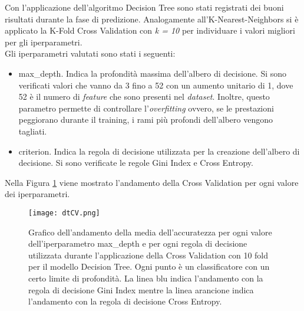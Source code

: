 Con l'applicazione dell'algoritmo Decision Tree sono stati registrati dei buoni risultati durante la fase di predizione. Analogamente all'K-Nearest-Neighbors si è applicato la K-Fold Cross Validation con \emph{k = 10} per individuare i valori migliori per gli iperparametri.\\
Gli iperparametri valutati sono stati i seguenti:
\begin{itemize}
	\item \textsf{max\_depth}. Indica la profondità massima dell'albero di decisione. Si sono verificati valori che vanno da 3 fino a 52 con un aumento unitario di 1, dove 52 è il numero di \emph{feature} che sono presenti nel \emph{dataset}. Inoltre, questo parametro permette di controllare l'\emph{overfitting} ovvero, se le prestazioni peggiorano durante il training, i rami più profondi dell'albero vengono tagliati.
	\item \textsf{criterion}. Indica la regola di decisione utilizzata per la creazione dell'albero di decisione. Si sono verificate le regole Gini Index e Cross Entropy.
\end{itemize}

Nella Figura \ref{fig:dtCV} viene mostrato l'andamento della Cross Validation per ogni valore dei iperparametri.
\begin{figure}[h]
	\begin{center}
		\texttt{[image: dtCV.png]}
		\caption{Grafico dell'andamento della media dell'accuratezza per ogni valore dell'iperparametro max\_depth e per ogni regola di decisione utilizzata durante l'applicazione della Cross Validation con 10 fold per il modello Decision Tree. Ogni punto è un classificatore con un certo limite di profondità. La linea blu indica l'andamento con la regola di decisione Gini Index mentre la linea arancione indica l'andamento con la regola di decisione Cross Entropy.
		} 
		\label{fig:dtCV}
	\end{center}
\end{figure}

